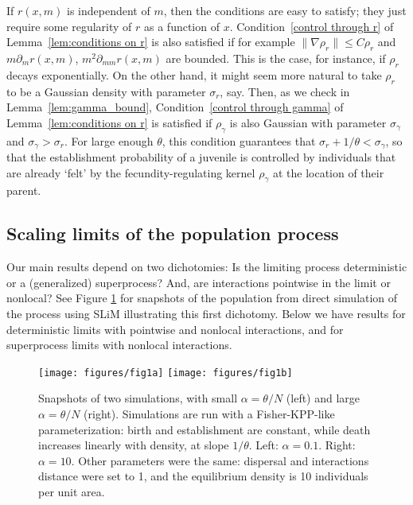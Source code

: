 \documentclass[12pt]{article}
\numberwithin{equation}{section}
\begin{document}
If $r(x,m)$ is independent of $m$, then the conditions are easy to 
satisfy; they just require some regularity of $r$ as a function of $x$. 
Condition~\ref{control through r} of Lemma~\ref{lem:conditions on r} is also satisfied if for example
$\|\nabla\rho_r\|\leq C\rho_r$ 
and $m\partial_mr(x,m)$, $m^2\partial_{mm}r(x,m)$ are bounded.
This is the case, for instance, if $\rho_r$ decays exponentially.
On the other hand, it might seem more natural to take $\rho_r$ to be a Gaussian 
density with parameter $\sigma_r$, say. Then, 
as we check in Lemma~\ref{lem:gamma_bound},
Condition~\ref{control through gamma} of Lemma~\ref{lem:conditions on r}
is satisfied if $\rho_\gamma$ is also
Gaussian with parameter $\sigma_\gamma$ and $\sigma_\gamma>\sigma_r$. For large enough
$\theta$, this condition guarantees that 
$\sigma_r+1/\theta <\sigma_\gamma$, so that the establishment probability of a juvenile
is controlled by individuals that are already `felt' by the fecundity-regulating kernel $\rho_\gamma$
at the location of their parent. 


\subsection{Scaling limits of the population process}

Our main results depend on two dichotomies:
Is the limiting process deterministic or a (generalized) superprocess?
And, are interactions pointwise in the limit or nonlocal?
See Figure \ref{fig:super_vs_det_2d} for snapshots of the population
from direct simulation of the process using SLiM \citep{haller_slim_2019}
illustrating this first dichotomy.
Below we have results for deterministic limits with pointwise and nonlocal interactions,
and for superprocess limits with nonlocal interactions.


\begin{figure}
    \begin{center}
        \texttt{[image: figures/fig1a]}
        \texttt{[image: figures/fig1b]}
    \end{center}
    \caption{
        Snapshots of two simulations, with small $\alpha=\theta/N$ (left) and large 
	$\alpha =\theta/N$ (right).
        Simulations are run with a Fisher-KPP-like parameterization:
        birth and establishment are constant, while death increases linearly with density,
        at slope $1/\theta$.
        Left: $\alpha=0.1$. Right: $\alpha=10$.
        Other parameters were the same:
        dispersal and interactions distance were set to 1,
        and the equilibrium density is 10 individuals per unit area.
        \label{fig:super_vs_det_2d}
    }
\end{figure}
\end{document}
